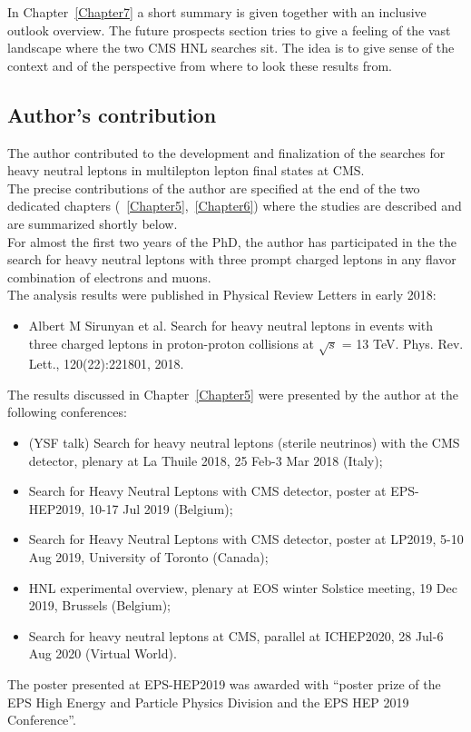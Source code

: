 In Chapter~\ref{Chapter7} a short summary is given together with an
inclusive outlook overview. The future prospects section tries to give a feeling of the vast landscape
where the two CMS HNL searches sit. The idea is to give sense of the
context and of the perspective from where to look these results
from.

\subsection*{Author's contribution}

The author contributed to the development and finalization of the
searches for heavy neutral leptons in multilepton lepton final
states at CMS.\\
The precise contributions of the author are specified at
the end of the two dedicated chapters
(~\ref{Chapter5},~\ref{Chapter6}) where the studies are described
and are summarized shortly below.\\

For almost the first two years of the PhD, the author
has participated in the the search for heavy neutral leptons with three
prompt charged leptons in any flavor combination of electrons and
muons. \\
The analysis
results were published in Physical Review Letters in early 2018:
\begin{itemize}
\setlength\itemsep{-0.1em}
\item Albert M Sirunyan et al. Search for heavy neutral leptons in events with three charged leptons
in proton-proton collisions at $\sqrt{s}$ = 13 TeV. Phys. Rev. Lett., 120(22):221801, 2018.
\end{itemize}

The results discussed in Chapter~\ref{Chapter5} were presented by the author at the following
conferences:
\begin{itemize}
\setlength\itemsep{-0.1em}
\item (YSF talk) Search for heavy neutral leptons (sterile
  neutrinos) with the CMS detector, plenary at La Thuile 2018, 25
  Feb-3 Mar 2018 (Italy);
\item Search for Heavy Neutral Leptons with CMS detector, poster at
  EPS-HEP2019, 10-17 Jul 2019 (Belgium);
\item Search for Heavy Neutral Leptons with CMS detector, poster at
  LP2019, 5-10 Aug 2019, University of Toronto (Canada);
\item HNL experimental overview, plenary at EOS winter Solstice
  meeting, 19 Dec 2019, Brussels (Belgium);
\item  Search for heavy neutral leptons at CMS, parallel at
  ICHEP2020, 28 Jul-6 Aug 2020 (Virtual World).
\end{itemize}
The poster presented at EPS-HEP2019 was awarded with ``poster prize of
the EPS High Energy and Particle Physics Division and the EPS HEP 2019
Conference''.\\
 
